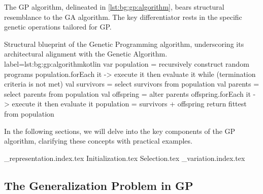   The GP algorithm, delineated in \vref{lst:bg:gp:algorithm}, bears structural 
  resemblance to the GA algorithm. The key differentiator rests in the specific 
  genetic operations tailored for GP.

  \begin{code}{
    Structural blueprint of the Genetic Programming algorithm, underscoring its 
    architectural alignment with the Genetic Algorithm.
  }{label=lst:bg:gp:algorithm}{kotlin}
    var population = recursively construct random programs
    population.forEach { it -> execute it then evaluate it }
    while (termination criteria is not met) {
      val survivors = select survivors from population
      val parents = select parents from population
      val offspring = alter parents
      offspring.forEach { it -> execute it then evaluate it }
      population = survivors + offspring
    }
    return fittest from population
  \end{code}

  In the following sections, we will delve into the key components of the GP 
  algorithm, clarifying these concepts with practical examples.

{_representation.index.tex}
{Initialization.tex}
{Selection.tex}
{_variation.index.tex}

\subsection{The Generalization Problem in GP}
